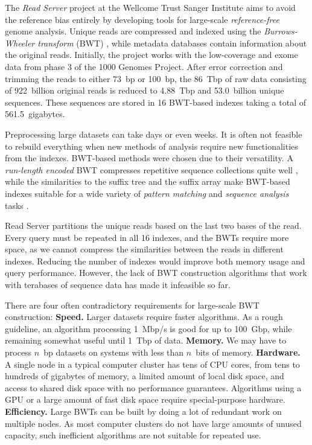 \documentclass[smallabstract,smallcaptions]{dccpaper}
\newcommand{\BWT}{\textsf{BWT}}
\begin{document}
The \emph{Read Server} project at the Wellcome Trust Sanger Institute aims to avoid the reference bias entirely by developing tools for large-scale \emph{reference-free} genome analysis. Unique reads are compressed and indexed using the \emph{Burrows-Wheeler transform} (\BWT) \cite{Burrows1994}, while metadata databases contain information about the original reads. Initially, the project works with the low-coverage and exome data from phase 3 of the 1000 Genomes Project. After error correction and trimming the reads to either 73~bp or 100~bp, the 86~Tbp of raw data consisting of 922~billion original reads is reduced to 4.88~Tbp and 53.0~billion unique sequences. These sequences are stored in 16 \BWT-based indexes \cite{Ferragina2005a} taking a total of 561.5~gigabytes.

Preprocessing large datasets can take days or even weeks. It is often not feasible to rebuild everything when new methods of analysis require new functionalities from the indexes. \BWT-based methods were chosen due to their versatility. A \emph{run-length encoded} \BWT{} compresses repetitive sequence collections quite well \cite{Maekinen2010}, while the similarities to the suffix tree and the suffix array make \BWT-based indexes suitable for a wide variety of \emph{pattern matching} and \emph{sequence analysis} tasks \cite{Ohlebusch2013,Maekinen2015}.

Read Server partitions the unique reads based on the last two bases of the read. Every query must be repeated in all 16 indexes, and the \BWT{}s require more space, as we cannot compress the similarities between the reads in different indexes. Reducing the number of indexes would improve both memory usage and query performance. However, the lack of \BWT{} construction algorithms that work with terabases of sequence data has made it infeasible so far.

There are four often contradictory requirements for large-scale \BWT{} construction:
\textbf{Speed.} Larger datasets require faster algorithms. As a rough guideline, an algorithm processing 1~Mbp/s is good for up to 100~Gbp, while remaining somewhat useful until 1~Tbp of data.
\textbf{Memory.} We may have to process $n$~bp datasets on systems with less than $n$~bits of memory.
\textbf{Hardware.} A single node in a typical computer cluster has tens of CPU cores, from tens to hundreds of gigabytes of memory, a limited amount of local disk space, and access to shared disk space with no performance guarantees. Algorithms using a GPU or a large amount of fast disk space require special-purpose hardware.
\textbf{Efficiency.} Large \BWT{}s can be built by doing a lot of redundant work on multiple nodes. As most computer clusters do not have large amounts of unused capacity, such inefficient algorithms are not suitable for repeated use.
\end{document}
